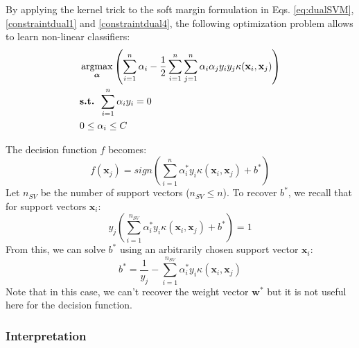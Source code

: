By applying the kernel trick to the soft margin formulation in Eqs. \ref{eq:dualSVM}, \ref{constraintdual1} and \ref{constraintdual4}, the following optimization problem allows to learn non-linear classifiers:
\begin{align}
	& \argmax_{\boldsymbol{\alpha}} \left( 
	\sum\limits_{i=1}^{n} \alpha_i - \frac{1}{2} \sum\limits_{i=1}^{n} \sum\limits_{j=1}^{n} \alpha_i \alpha_j y_i y_j \kappa(\textbf{x}_i , \textbf{x}_j) 
	\right) 
	\label{eq:dualSVM2kernel}\\
	& \textbf{s.t. } \sum\limits_{i=1}^{n}\alpha_i y_i = 0 \label{constraintdual3kernel}\\
	& 0 \leq \alpha_i \leq C  \label{constraintdual4kernel}
\end{align}

\noindent The decision function $f$ becomes:
\begin{equation}
f(\textbf{x}_j) = sign\left( \sum\limits_{i=1}^{n} \alpha_i^*y_i \kappa(\textbf{x}_i,\textbf{x}_j) + b^*\right)  \label{decisionDualKernel}
\end{equation} 
\noindent Let $n_{SV}$ be the number of support vectors ($n_{SV} \leq n$). To recover $b^*$, we recall that for support vectors $\textbf{x}_i$:
\begin{equation}
	y_j \left( \sum\limits_{i=1}^{n_{SV}} \alpha_i^* y_i \kappa(\textbf{x}_i,\textbf{x}_j) + b^* \right) = 1
\end{equation}
From this, we can solve $b^*$ using an arbitrarily chosen support vector $\textbf{x}_i$:
\begin{equation}
	b^* = \frac{1}{y_j} - \sum\limits_{i=1}^{n_{SV}} \alpha_i^* y_i \kappa(\textbf{x}_i,\textbf{x}_j)
\end{equation}
\noindent Note that in this case, we can't recover the weight vector $\textbf{w}^*$ but it is not useful here for the decision function.

\subsubsection{Interpretation}
\label{subsec:interpretation}


